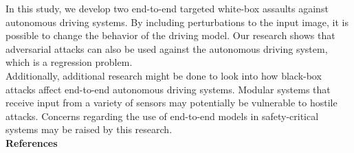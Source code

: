 \documentclass[ 12pt,a4paper,twocolumn,fleqn]{article}
\begin{document}
In this study, we develop two end-to-end targeted white-box assaults against autonomous driving systems. By including perturbations to the input image, it is possible to change the behavior of the driving model. Our research shows that adversarial attacks can also be used against the autonomous driving system, which is a regression problem.\\
Additionally, additional research might be done to look into how black-box attacks affect end-to-end autonomous driving systems. Modular systems that receive input from a variety of sensors may potentially be vulnerable to hostile attacks. Concerns regarding the use of end-to-end models in safety-critical systems may be raised by this research.\\
\newpage
\textbf{\LARGE{References}}\\
\end{document}
